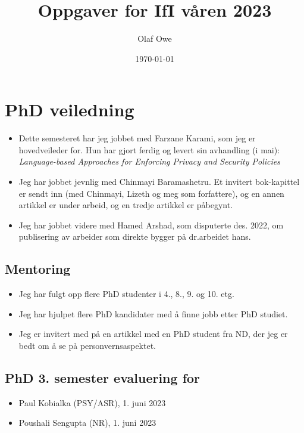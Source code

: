 \documentclass[11pt]{article}
\author{Olaf Owe}
\date{\today}
\title{Oppgaver for IfI våren 2023}
\begin{document}
\maketitle



\section{PhD veiledning}
\label{sec-1}
\begin{itemize}
\item Dette semesteret har  jeg jobbet med Farzane Karami,
som jeg er hovedveileder for. Hun har gjort  ferdig og levert sin
avhandling  (i mai):
\emph{Language-based Approaches for Enforcing Privacy and Security Policies}

\item Jeg har jobbet jevnlig med Chinmayi Baramashetru. Et invitert bok-kapittel
er sendt inn (med Chinmayi, Lizeth og meg som forfattere),
og en annen artikkel er under arbeid, og en tredje artikkel er påbegynt.

\item Jeg har jobbet videre med Hamed Arshad, som  disputerte  des. 2022,
om publisering av arbeider som direkte bygger på dr.arbeidet hans.
\end{itemize}
\subsection{Mentoring}
\label{sec-1-1}

\begin{itemize}
\item Jeg har fulgt opp flere PhD studenter i 4.,
8., 9. og 10. etg.
\end{itemize}

\begin{itemize}
\item Jeg har hjulpet flere  PhD kandidater med å finne jobb
etter PhD studiet.

\item Jeg er invitert med på en artikkel med en PhD student fra ND, der
jeg er bedt om å se på personvernsaspektet.
\end{itemize}
\subsection{PhD 3. semester evaluering for}
\label{sec-1-2}

\begin{itemize}
\item Paul Kobialka (PSY/ASR), 1. juni 2023
\item Poushali Sengupta (NR), 1. juni 2023
\end{itemize}
\end{document}
